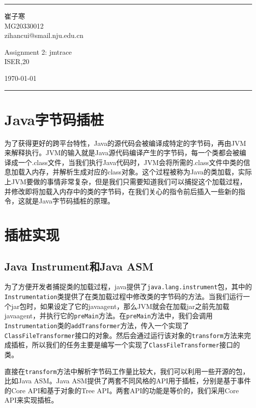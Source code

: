 \documentclass[UTF8]{ctexart}
\begin{document}
\fancyhead[C]{}
\hrule \medskip %
\begin{minipage}{0.295\textwidth} 
\raggedright
\footnotesize
崔子寒 \hfill\\   
MG20330012 \hfill\\
zihancui@smail.nju.edu.cn
\end{minipage}
\begin{minipage}{0.4\textwidth} 
\centering 
\large 
Assignment 2: jmtrace\\ 
\normalsize 
ISER,20\\ 
\end{minipage}
\begin{minipage}{0.295\textwidth} 
\raggedleft
\today\hfill\\
\end{minipage}
\medskip\hrule 
\bigskip

\section{Java字节码插桩}
为了获得更好的跨平台特性，Java的源代码会被编译成特定的字节码，再由JVM来解释执行。JVM的输入就是Java源代码编译产生的字节码，每一个类都会被编译成一个.class文件，当我们执行Java代码时，JVM会将所需的.class文件中类的信息加载入内存，并解析生成对应的class对象。这个过程被称为Java的类加载，实际上JVM要做的事情非常复杂，但是我们只需要知道我们可以捕捉这个加载过程，并修改即将加载入内存中的类的字节码，在我们关心的指令前后插入一些新的指令，这就是Java字节码插桩的原理。
\section{插桩实现}
\subsection{Java Instrument和Java ASM}
为了方便开发者捕捉类的加载过程，java提供了\texttt{java.lang.instrument}包，其中的\texttt{Instrumentation}类提供了在类加载过程中修改类的字节码的方法。当我们运行一个jar包时，如果设定了它的javaagent，那么JVM就会在加载jar之前先加载javaagent，并执行它的\texttt{preMain}方法。在\texttt{preMain}方法中，我们会调用\texttt{Instrumentation}类的\texttt{addTransformer}方法，传入一个实现了\texttt{ClassFileTransformer}接口的对象。然后会通过运行该对象的\texttt{transform}方法来完成插桩，所以我们的任务主要是编写一个实现了\texttt{ClassFileTransformer}接口的类。

直接在\texttt{transform}方法中解析字节码工作量比较大，我们可以利用一些开源的包，比如Java ASM。Java ASM提供了两套不同风格的API用于插桩，分别是基于事件的Core API和基于对象的Tree API。两套API的功能是等价的，我们采用Core API来实现插桩。
\end{document}
